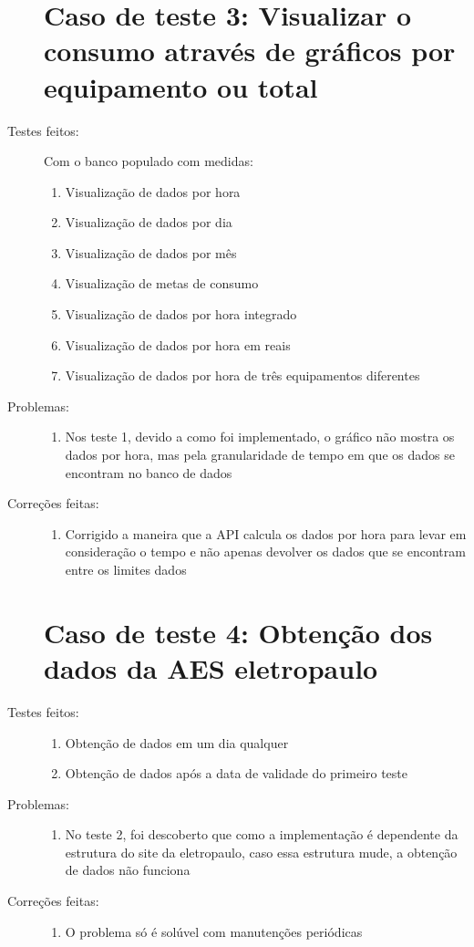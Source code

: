 \begin{description}
  \section{Caso de teste 3: Visualizar o consumo através de gráficos por equipamento ou total}
  \item[Testes feitos:]
  Com o banco populado com medidas:
  \begin{enumerate}
    \item{Visualização de dados por hora}
    \item{Visualização de dados por dia}
    \item{Visualização de dados por mês}
    \item{Visualização de metas de consumo}
    \item{Visualização de dados por hora integrado}
    \item{Visualização de dados por hora em reais}
    \item{Visualização de dados por hora de três equipamentos diferentes}
  \end{enumerate}
  \item[Problemas:]
  \begin{enumerate}
    \item{Nos teste 1, devido a como foi implementado, o gráfico não mostra os dados por hora, mas pela granularidade de tempo em que os dados se encontram no banco de dados}
  \end{enumerate}
  \item[Correções feitas:]
  \begin{enumerate}
    \item{Corrigido a maneira que a API calcula os dados por hora para levar em consideração o tempo e não apenas devolver os dados que se encontram entre os limites dados}
  \end{enumerate}

  \section{Caso de teste 4: Obtenção dos dados da AES eletropaulo}
  \item[Testes feitos:]
  \begin{enumerate}
    \item{Obtenção de dados em um dia qualquer}
    \item{Obtenção de dados após a data de validade do primeiro teste}
  \end{enumerate}
  \item[Problemas:]
  \begin{enumerate}
    \item{No teste 2, foi descoberto que como a implementação é dependente da estrutura do site da eletropaulo, caso essa estrutura mude, a obtenção de dados não funciona}
  \end{enumerate}
  \item[Correções feitas:]
  \begin{enumerate}
    \item{O problema só é solúvel com manutenções periódicas}
  \end{enumerate}



\end{description}
